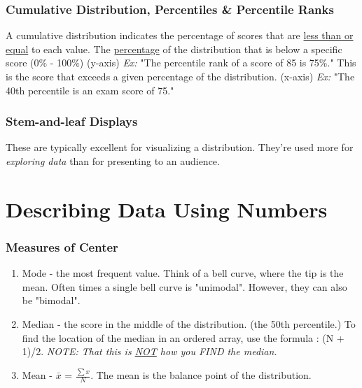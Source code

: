 \documentclass[11pt]{report}
\begin{document}
{    
}

\subsubsection{Cumulative Distribution, Percentiles \& Percentile Ranks}
{
    A cumulative distribution indicates the percentage of scores that are \underline{less than or equal} to each value.
}
{
    The \underline{percentage} of the distribution that is below a specific score (0\% - 100\%) (y-axis)
    \newline 
    \textit{Ex:} "The percentile rank of a score of 85 is 75\%."
}
{
    This is the score that exceeds a given percentage of the distribution. (x-axis)
    \newline
    \textit{Ex:} "The 40th percentile is an exam score of 75."
}

\subsubsection{Stem-and-leaf Displays}
These are typically excellent for visualizing a distribution. They're used more for 
\textit{exploring data} than for presenting to an audience. 

\section{Describing Data Using Numbers}
\subsubsection{Measures of Center}
\begin{enumerate}
    \item Mode - the most frequent value. Think of a bell curve, where the tip is the mean. Often times a single bell curve is "unimodal". 
    However, they can also be "bimodal".
    \item Median - the score in the middle of the distribution. (the 50th percentile.) 
    To find the location of the median in an ordered array, use the formula : (N + 1)/2. \textit{NOTE: That this is \underline{NOT} how you FIND the median.}
    \item Mean - $\bar{x}$ = $\frac{\sum x}{N}$. The mean is the balance point of the distribution.
\end{enumerate}
\end{document}
